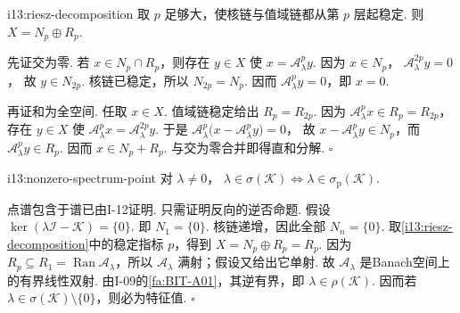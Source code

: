 \begin{FALemma}[A][局部Riesz分解]{i13:riesz-decomposition}
取 \(\displaystyle p\) 足够大，使核链与值域链都从第 \(\displaystyle p\) 层起稳定. 则
\(\displaystyle X = N_p\oplus R_p\).
\end{FALemma}

\begin{FAProof}
先证交为零. 若 \(\displaystyle x\in N_p\cap R_p\)，则存在 \(\displaystyle y\in X\) 使 \(\displaystyle x=\mathcal A_\lambda^py\). 因为 \(\displaystyle x\in N_p\)，
\(\displaystyle \mathcal A_\lambda^{2p}y=0\)，
故 \(\displaystyle y\in N_{2p}\). 核链已稳定，所以 \(\displaystyle N_{2p}=N_p\). 因而 \(\displaystyle \mathcal A_\lambda^py=0\)，即 \(\displaystyle x=0\).

再证和为全空间. 任取 \(\displaystyle x\in X\). 值域链稳定给出 \(\displaystyle R_p=R_{2p}\). 因为 \(\displaystyle \mathcal A_\lambda^px\in R_p=R_{2p}\)，存在 \(\displaystyle y\in X\) 使
\(\displaystyle \mathcal A_\lambda^px = \mathcal A_\lambda^{2p}y\).
于是
\(\displaystyle \mathcal A_\lambda^p \bigl(x-\mathcal A_\lambda^py\bigr) =0\)，
故 \(\displaystyle x-\mathcal A_\lambda^py\in N_p\)，而 \(\displaystyle \mathcal A_\lambda^py\in R_p\). 因而 \(\displaystyle x\in N_p+R_p\). 与交为零合并即得直和分解.
\hfill\(\square\)
\end{FAProof}

\begin{FAProposition}[A][非零谱点恰为特征值]{i13:nonzero-spectrum-point}
对 \(\displaystyle \lambda\neq0\)，
\(\displaystyle \lambda\in\sigma(\mathcal K) \iff \lambda\in\sigma_{\mathrm p}(\mathcal K)\).
\end{FAProposition}

\begin{FAProof}
点谱包含于谱已由I-12证明. 只需证明反向的逆否命题. 假设
\(\displaystyle \ker(\lambda\mathcal I-\mathcal K) = \{0\}\).
即 \(\displaystyle N_1=\{0\}\). 核链递增，因此全部 \(\displaystyle N_n=\{0\}\). 取\autoref{i13:riesz-decomposition}中的稳定指标 \(\displaystyle p\)，得到 \(\displaystyle X=N_p\oplus R_p=R_p\). 因为 \(\displaystyle R_p\subseteq R_1=\operatorname{Ran}\mathcal A_\lambda\)，所以 \(\displaystyle \mathcal A_\lambda\) 满射；假设又给出它单射. 故 \(\displaystyle \mathcal A_\lambda\) 是Banach空间上的有界线性双射. 由I-09的\autoref{fa:BIT-A01}，其逆有界，即 \(\displaystyle \lambda\in\rho(\mathcal K)\). 因而若 \(\displaystyle \lambda\in\sigma(\mathcal K)\setminus\{0\}\)，则必为特征值.
\hfill\(\square\)
\end{FAProof}

